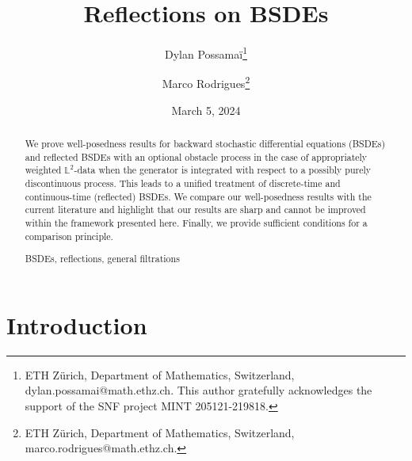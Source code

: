 \documentclass[10pt]{article} %
\newcommand{\1}{\mathbf{1}}
\begin{document}
\title{Reflections on BSDEs}


\author{Dylan {\sc Possama\"{i}}\footnote{ETH Z\"urich, Department of Mathematics, Switzerland, dylan.possamai@math.ethz.ch. This author gratefully acknowledges the support of the SNF project MINT 205121-219818.}\and Marco {\sc Rodrigues}\footnote{ETH Z\"urich, Department of Mathematics, Switzerland, marco.rodrigues@math.ethz.ch.}}

\date{March 5, 2024}

\maketitle

\begin{abstract}

We prove well-posedness results for backward stochastic differential equations (BSDEs) and reflected BSDEs with an optional obstacle process in the case of appropriately weighted $\mathbb{L}^2$-data when the generator is integrated with respect to a possibly purely discontinuous process. This leads to a unified treatment of discrete-time and continuous-time (reflected) BSDEs. We compare our well-posedness results with the current literature and highlight that our results are sharp and cannot be improved within the framework presented here. Finally, we provide sufficient conditions for a comparison principle.



\vspace{5mm}
  BSDEs, reflections, general filtrations\vspace{5mm}
\end{abstract}




	
\section{Introduction}\label{sec::introduction}
\end{document}

